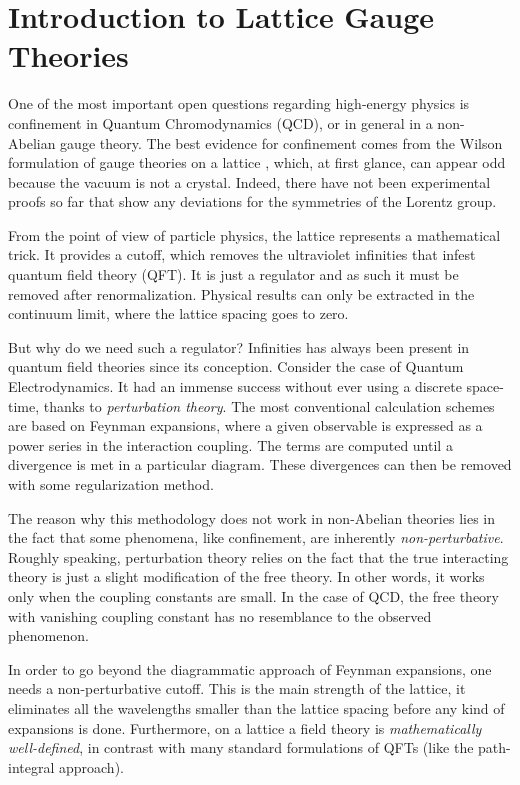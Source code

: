 \chapter{Introduction to Lattice Gauge Theories}
\label{chap:introduction_to_lattice_gauge_theories}

One of the most important open questions regarding high-energy physics is confinement in Quantum Chromodynamics (QCD), or in general in a non-Abelian gauge theory.
The best evidence for confinement comes from the Wilson formulation of gauge theories on a lattice \cite{wilson1974confinement}, which, at first glance, can appear odd because the vacuum is not a crystal.
Indeed, there have not been experimental proofs so far that show any deviations for the symmetries of the Lorentz group.

From the point of view of particle physics, the lattice represents a mathematical trick.
It provides a cutoff, which removes the ultraviolet infinities that infest quantum field theory (QFT).
It is just a regulator and as such it must be removed after renormalization.
Physical results can only be extracted in the continuum limit, where the lattice spacing goes to zero.

But why do we need such a regulator?
Infinities has always been present in quantum field theories since its conception.
Consider the case of Quantum Electrodynamics.
It had an immense success without ever using a discrete space-time, thanks to \emph{perturbation theory}.
The most conventional calculation schemes are based on Feynman expansions,
where a given observable is expressed as a power series in the interaction coupling.
The terms are computed until a divergence is met in a particular diagram.
These divergences can then be removed with some regularization method.

The reason why this methodology does not work in non-Abelian theories lies in the fact that some phenomena, like confinement, are inherently \emph{non-perturbative}.
Roughly speaking, perturbation theory relies on the fact that the true interacting theory is just a slight modification of the free theory.
In other words, it works only when the coupling constants are small.
In the case of QCD, the free theory with vanishing coupling constant has no resemblance to the observed phenomenon.

In order to go beyond the diagrammatic approach of Feynman expansions, one needs a non-perturbative cutoff.
This is the main strength of the lattice, it eliminates all the wavelengths smaller than the lattice spacing before any kind of expansions is done.
Furthermore, on a lattice a field theory is \emph{mathematically well-defined}, in contrast with many standard formulations of QFTs (like the path-integral approach).

